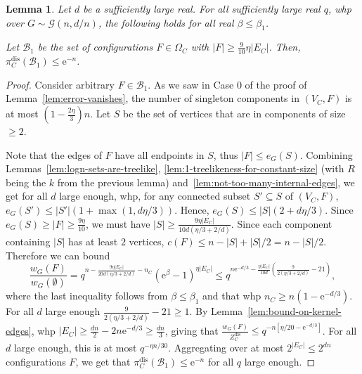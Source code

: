 \documentclass[11pt]{article}
\theoremstyle{plain}
\newtheorem{lemma}[theorem]{Lemma}
\newcommand{\G}{\mathcal{G}}
\newcommand{\emm}{\mathrm{e}}
\newcommand{\1}{\mathbb{1}}
\newcommand{\dis}{\mathrm{dis}}
\begin{document}
\begin{lemma}\label{lem:error-vanishes-under-disorder}
    Let $d$ be a sufficiently large real. For all sufficiently large real $q$, whp over \(G\sim\G(n,d/n)\), the following holds for all real \(\beta\leq\beta_1\).

    Let $\mathcal{B}_1$ be the set of configurations $F\in \Omega_C$ with $ |F|\geq \tfrac{9}{10}\eta |E_C|$.  Then, $\pi^{\dis}_C(\mathcal{B}_1)\leq \emm^{-n}$.
\end{lemma}
\begin{proof}
    Consider arbitrary $F\in \mathcal{B}_1$.  As we saw in Case 0 of the proof of Lemma~\ref{lem:error-vanishes},  the number of singleton components in \((V_C,F)\) is at most \((1-\frac{2\eta}{3})n\). Let \(S\) be the set of vertices that are in components of size \(\geq 2\).

    Note that the edges of \(F\) have all endpoints in \(S\), thus \(|F|\leq e_G(S)\). Combining Lemmas~\ref{lem:logn-sets-are-treelike}, \ref{lem:1-treelikeness-for-constant-size} (with \(R\) being the  \(k\) from the previous lemma) and~\ref{lem:not-too-many-internal-edges}, we get for all \(d\) large enough, whp, for any connected subset \(S'\subseteq S\) of \((V_C,F)\), \(e_G(S') \leq |S'|(1+\max(1, d\eta/3))\). Hence, \(e_G(S)\leq |S|(2+d\eta/3)\). Since \(e_G(S)\geq |F|\geq\tfrac{9\eta}{10}\), we must have \(|S|\geq \frac{9\eta|E_C|}{10d(\eta/3 + 2/d)}\). Since each component containing \(|S|\) has at least \(2\) vertices, \(c(F)\leq n-|S| + |S|/2 = n - |S|/2\). Therefore we can bound
    \[
    \frac{w_G(F)}{w_G(\emptyset)} = q^{n-\frac{9\eta|E_C|}{20d(\eta/3+2/d)}-n_C} (\emm^\beta -1)^{\eta |E_C|}\leq q^{n\emm^{-d/3}-\frac{\eta|E_C|}{10d}(\frac{9}{2(\eta/3+2/d)} - 21)},
    \]
    where the last inequality follows from \(\beta\leq \beta_1\) and that whp \(n_C\geq n(1-\emm^{-d/3})\). For all \(d\) large enough \(\frac{9}{2(\eta/3 +2/d)}-21\geq 1\). By Lemma~\ref{lem:bound-on-kernel-edges}, whp \(|E_C|\geq \frac{dn}{2}-2n\emm^{-d/3}\geq \frac{dn}{3}\), giving that \( \frac{w_G(F)}{Z_C^\dis}  \leq q^{-n[\eta/20-\emm^{-d/3}]}\). For all \(d\) large enough, this is at most \(q^{-\eta n /30}\). Aggregating over at most \(2^{|E_C|}\leq 2^{dn}\) configurations \(F\), we get that \(\pi^\dis_C(\mathcal{B}_1)\leq \emm^{-n}\) for all \(q\) large enough.
\end{proof}
\end{document}
